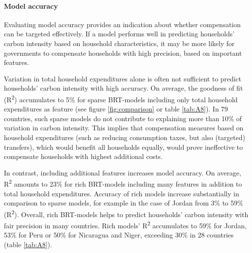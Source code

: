 \documentclass[12pt, a4paper]{article}
\begin{document}
\paragraph{Model accuracy} 
Evaluating model accuracy provides an indication about whether compensation can be targeted effectively. If a model performs well in predicting households' carbon intensity based on household characteristics, it may be more likely for governments to compensate households with high precision, based on important features. 

Variation in total household expenditures alone is often not sufficient to predict households' carbon intensity with high accuracy. On average, the goodness of fit (R\textsuperscript{2}) accumulates to 5\% for sparse BRT-models including only total household expenditures as feature (see figure \ref{fig:comparison} or table \ref{tab:A8}). In 79 countries, such sparse models do not contribute to explaining more than 10\% of variation in carbon intensity. This implies that compensation measures based on household expenditures (such as reducing consumption taxes, but also (targeted) transfers), which would benefit all households equally, would prove ineffective to compensate households with highest additional costs.

In contrast, including additional features increases model accuracy. On average, R\textsuperscript{2} amounts to 23\% for rich BRT-models including many features in addition to total household expenditures. Accuracy of rich models increase substantially in comparison to sparse models, for example in the case of Jordan from 3\% to 59\% (R\textsuperscript{2}). Overall, rich BRT-models helps to predict households' carbon intensity with fair precision in many countries. Rich models' R\textsuperscript{2} accumulates to 59\% for Jordan, 53\% for Peru or 50\% for Nicaragua and Niger, exceeding 30\% in 28 countries (table \ref{tab:A8}).
\end{document}
